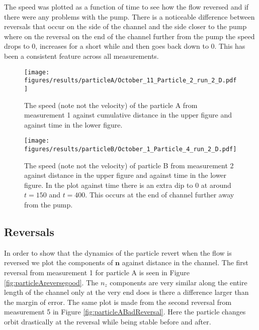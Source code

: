 The speed was plotted as a function of time to see how the flow reversed and if there were any problems with the pump. There is a noticeable difference between reversals that occur on the side of the channel and the side closer to the pump where on the reversal on the end of the channel further from the pump the speed drops to 0, increases for a short while and then goes back down to 0. This has been a consistent feature across all measurements.

\begin{figure}[H]
\begin{center}
\texttt{[image: figures/results/particleA/October\_11\_Particle\_2\_run\_2\_D.pdf]}
\end{center}
\caption{The speed (note not the velocity) of the particle A from measurement 1 against cumulative distance in the upper figure and against time in the lower figure.}
\label{fig:particleAspeed}
\end{figure}


\begin{figure}[H]
\begin{center}
\texttt{[image: figures/results/particleB/October\_1\_Particle\_4\_run\_2\_D.pdf]}
\end{center}
\caption{The speed (note not the velocity) of particle B from measurement 2 against distance in the upper figure and against time in the lower figure. In the plot against time there is an extra dip to 0 at around $t=150$ and $t=400$. This occurs at the end of channel further away from the pump.}
\label{fig:particleB1speed}
\end{figure}


\subsection{Reversals}
In order to show that the dynamics of the particle revert when the flow is reversed we plot the components of $\mathbf{n}$ against distance in the channel. The first reversal from measurement 1 for particle A is seen in Figure \ref{fig:particleAreversegood}. The $n_z$ components are very similar along the entire length of the channel only at the very end does is there a difference larger than the margin of error. The same plot is made from the second reversal from measurement 5 in Figure \ref{fig:particleABadReversal}. Here the particle changes orbit drastically at the reversal while being stable before and after. 

